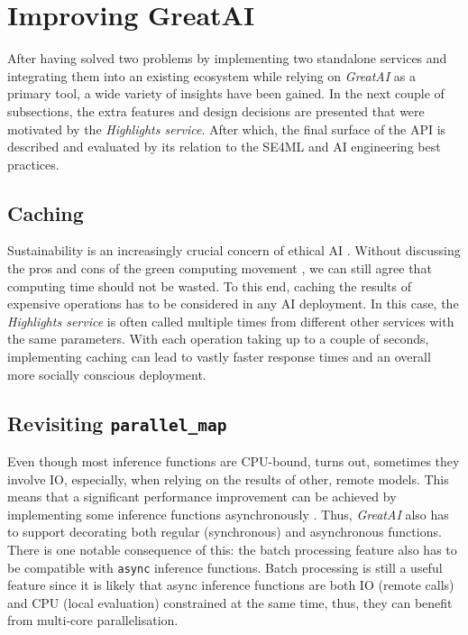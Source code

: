 \section{Improving GreatAI}

After having solved two problems by implementing two standalone services and integrating them into an existing ecosystem while relying on \textit{GreatAI} as a primary tool, a wide variety of insights have been gained. In the next couple of subsections, the extra features and design decisions are presented that were motivated by the \textit{Highlights service}. After which, the final surface of the API is described and evaluated by its relation to the SE4ML \cite{serban2020adoption,serban2021practices} and AI engineering \cite{john2020architecting,john2020ai} best practices.

\subsection{Caching}

Sustainability is an increasingly crucial concern of ethical AI \cite{van2021sustainable}. Without discussing the pros and cons of the green computing movement \cite{10.1145/1400181.1400186}, we can still agree that computing time should not be wasted. To this end, caching the results of expensive operations has to be considered in any AI deployment. In this case, the \textit{Highlights service} is often called multiple times from different other services with the same parameters. With each operation taking up to a couple of seconds, implementing caching can lead to vastly faster response times and an overall more socially conscious deployment.

\subsection{Revisiting \texttt{parallel\_map}}

Even though most inference functions are CPU-bound, turns out, sometimes they involve IO, especially, when relying on the results of other, remote models. This means that a significant performance improvement can be achieved by implementing some inference functions asynchronously \cite{tilkov2010node}. Thus, \textit{GreatAI} also has to support decorating both regular (synchronous) and asynchronous functions. There is one notable consequence of this: the batch processing feature also has to be compatible with \texttt{async} inference functions. Batch processing is still a useful feature since it is likely that async inference functions are both IO (remote calls) and CPU (local evaluation) constrained at the same time, thus, they can benefit from multi-core parallelisation. 

